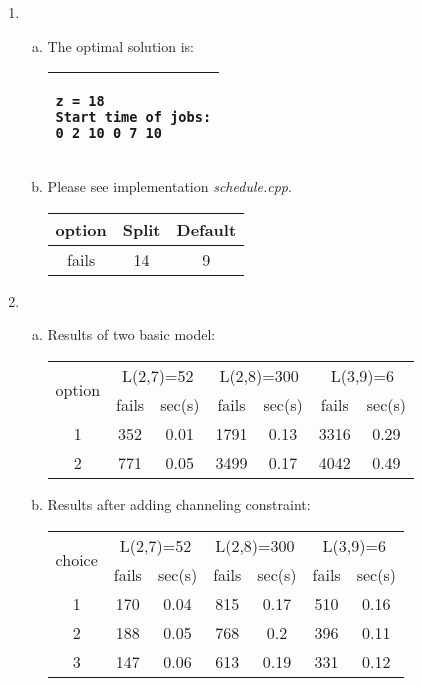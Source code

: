 \documentclass[a4paper,12pt]{article}
\begin{document}
\begin{enumerate}[1.]
\item
\begin{enumerate}[(a)]
  \item
  The optimal solution is:
\begin{center}
\begin{tabular}{|p{.95\linewidth}|}
\hline
\vspace*{-12pt}
\begin{verbatim}
z = 18
Start time of jobs:
0 2 10 0 7 10
\end{verbatim}
\vspace*{-20pt}
\\
\hline
\end{tabular}
\end{center}
\item
Please see implementation \textit{schedule.cpp}.
\begin{center}
\begin{tabular}{|c|c|c|}
\hline
option & Split & Default\\
\hline
fails  & 14    & 9\\
\hline
\end{tabular}
\end{center}
\end{enumerate}
\item
\begin{enumerate}[(a)]
  \item
Results of two basic model:
\begin{table}[h!]
\centering
\begin{tabular}{|c|c|c|c|c|c|c|}
\hline
\multirow{2}{*}{option} & \multicolumn{2}{|c|}{L(2,7)=52} & \multicolumn{2}{|c|}{L(2,8)=300} & \multicolumn{2}{|c|}{L(3,9)=6}\\
\cline{2-7}
                        & fails & sec(s)            & fails & sec(s)            & fails & sec(s)\\
\hline
1 & 352 & 0.01 & 1791 & 0.13 & 3316 & 0.29\\
\hline
2 & 771 & 0.05 & 3499 & 0.17 & 4042 & 0.49\\
\hline
\end{tabular}
\end{table}
  \item
Results after adding channeling constraint:
\begin{table}[!ht]
\centering
\begin{tabular}{|c|c|c|c|c|c|c|}
\hline
\multirow{2}{*}{choice} & \multicolumn{2}{|c|}{L(2,7)=52} & \multicolumn{2}{|c|}{L(2,8)=300} & \multicolumn{2}{|c|}{L(3,9)=6}\\
\cline{2-7}
                        & fails & sec(s)            & fails & sec(s)            & fails & sec(s)\\
\hline
1 & 170 & 0.04 & 815 & 0.17 & 510 & 0.16\\
\hline
2 & 188 & 0.05 & 768 & 0.2  & 396 & 0.11\\
\hline
3 & 147 & 0.06 & 613 & 0.19 & 331 & 0.12\\
\hline
\end{tabular}
\end{table}


\end{enumerate}
\end{enumerate}
\end{document}

